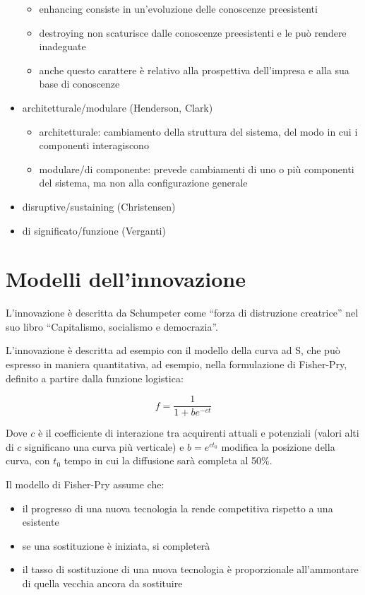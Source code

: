 \documentclass[answers, a4paper, 11pt]{exam}
\begin{document}
\begin{itemize}
    \begin{itemize}
        \item enhancing consiste in un'evoluzione delle conoscenze preesistenti
        \item destroying non scaturisce dalle conoscenze preesistenti e le può rendere inadeguate
        \item anche questo carattere è relativo alla prospettiva dell'impresa e alla sua base di conoscenze
    \end{itemize}
    \item architetturale/modulare (Henderson, Clark)
    \begin{itemize}
        \item architetturale: cambiamento della struttura del sistema, del modo in cui i componenti interagiscono
        \item modulare/di componente: prevede cambiamenti di uno o più componenti del sistema, ma non alla configurazione generale
    \end{itemize}
    \item disruptive/sustaining (Christensen)
    \item di significato/funzione (Verganti)
    
\end{itemize}

\section{Modelli dell'innovazione}

L'innovazione è descritta da Schumpeter come ``forza di distruzione creatrice'' nel suo libro ``Capitalismo, socialismo e democrazia''.

L'innovazione è descritta ad esempio con il modello della curva ad S, che può espresso in maniera quantitativa, ad esempio, nella formulazione di Fisher-Pry, definito a partire dalla funzione logistica:

\begin{equation}
    f = \frac{1}{1 + b e^{-ct}}
\end{equation}

Dove $c$ è il coefficiente di interazione tra acquirenti attuali e potenziali (valori alti di $c$ significano una curva più verticale) e $b = e^{ct_0}$ modifica la posizione della curva, con $t_0$ tempo in cui la diffusione sarà completa al 50\%.

Il modello di Fisher-Pry assume che:
\begin{itemize}
    \item il progresso di una nuova tecnologia la rende competitiva rispetto a una esistente
    \item se una sostituzione è iniziata, si completerà
    \item il tasso di sostituzione di una nuova tecnologia è proporzionale all'ammontare di quella vecchia ancora da sostituire
\end{itemize}
\end{document}
